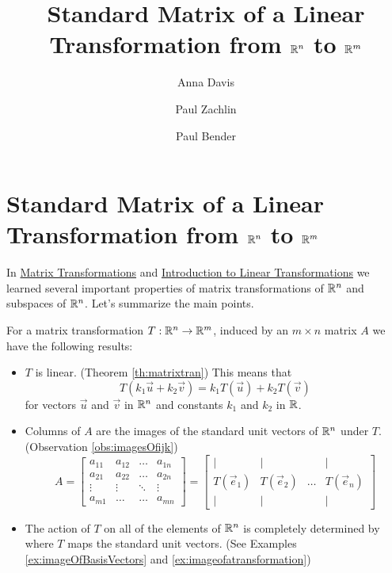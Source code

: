 \documentclass{ximera}
\author{Anna Davis \and Paul Zachlin \and Paul Bender} \title{Standard Matrix of a Linear Transformation from $\mathbb{R}^n$ to $\mathbb{R}^m$} \license{CC-BY 4.0}
\begin{document}
\begin{abstract}
 \end{abstract}
\maketitle


\section*{Standard Matrix of a Linear Transformation from $\mathbb{R}^n$ to $\mathbb{R}^m$}

In \href{https://ximera.osu.edu/oerlinalg/LinearAlgebra/LTR-0005/main}{Matrix Transformations} and \href{https://ximera.osu.edu/oerlinalg/LinearAlgebra/LTR-0010/main}{Introduction to Linear Transformations} we learned several important properties of matrix transformations of $\mathbb{R}^n$ and subspaces of $\mathbb{R}^n$.  Let's summarize the main points.
\begin{summary}\label{sum:matrixTrans}
For a matrix transformation $T:\mathbb{R}^n\rightarrow\mathbb{R}^m$, induced by an $m\times n$ matrix $A$ we have the following results:
\begin{itemize}
    \item $T$ is linear. (Theorem \ref{th:matrixtran})  This means that 
    $$T(k_1\vec{u}+k_2\vec{v})= k_1T(\vec{u})+k_2T(\vec{v})$$
    for vectors $\vec{u}$ and $\vec{v}$ in $\mathbb{R}^n$ and constants $k_1$ and $k_2$ in $\mathbb{R}$.
    \item Columns of $A$ are the images of the standard unit vectors of $\mathbb{R}^n$ under $T$. (Observation \ref{obs:imagesOfijk})
 \begin{equation*} \label{eq:matlintrans}
 A=\begin{bmatrix}
           a_{11} & a_{12}&\dots&a_{1n}\\
           a_{21}&a_{22} &\dots &a_{2n}\\
		\vdots & \vdots&\ddots &\vdots\\
		a_{m1}&\dots &\dots &a_{mn}
         \end{bmatrix}
		 = 
         \begin{bmatrix}
           | & |& &|\\
		T(\vec{e}_1) & T(\vec{e}_2)&\dots &T(\vec{e}_n)\\
		|&| & &|
         \end{bmatrix}
\end{equation*}
    
    \item The action of $T$ on all of the elements of $\mathbb{R}^n$ is completely determined by where $T$ maps the standard unit vectors. (See Examples \ref{ex:imageOfBasisVectors} and \ref{ex:imageofatransformation})
\end{itemize}
    
\end{summary}
\end{document}
